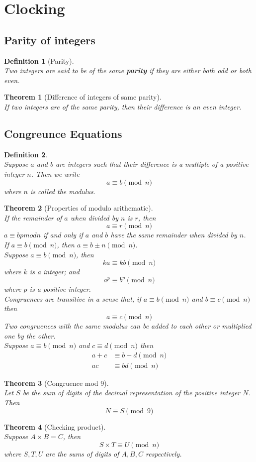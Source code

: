 \documentclass[12pt]{article}
\newtheorem{definition}{Definition}[section]
\newtheorem{theorem}{Theorem}[section]
\theoremstyle{definition}
\begin{document}
\section{Clocking}
\subsection{Parity of integers}
\begin{definition}[Parity]
\hfill\\\normalfont Two integers are said to be of the same \textbf{parity} if they are either both odd or both even.
\end{definition}
\begin{theorem}[Difference of integers of same parity]
\hfill\\\normalfont If two integers are of the same parity, then their difference is an even integer.
\end{theorem}
\subsection{Congreunce Equations}
\begin{definition}
\hfill\\\normalfont Suppose $a$ and $b$ are integers such that their difference is a multiple of a positive integer $n$. Then we write
\[
a\equiv b \pmod n
\]
where $n$ is called the modulus.
\end{definition}
\begin{theorem}[Properties of modulo arithematic]
\hfill\\\normalfont If the remainder of $a$ when divided by $n$ is $r$, then
\[
a\equiv r \pmod n
\]
$a\equiv b pmod n$ if and only if $a$ and $b$ have the same remainder when divided by $n$.\\
If $a\equiv b\pmod n$, then $a\equiv b\pm n\pmod n$.\\
Suppose $a\equiv b\pmod n$, then
\[
ka \equiv kb \pmod n
\]
where $k$ is a integer; and
\[
a^p\equiv b^p\pmod n
\]
where $p$ is a positive integer.\\
Congruences are transitive in a sense that, if $a\equiv b\pmod n$ and $b\equiv c\pmod n$ then
\[
a\equiv c\pmod n
\]
Two congruences with the same modulus can be added to each other or multiplied one by the other.\\Suppose $a\equiv b\pmod n$ and $c\equiv d\pmod n$ then
\begin{align*}
a+c&\equiv b+d\pmod n\\
ac&\equiv bd\pmod n
\end{align*}
\end{theorem}
\begin{theorem}[Congruence mod 9]
\hfill\\\normalfont Let $S$ be the sum of digits of the decimal representation of the positive integer $N$. Then
\[
N\equiv S\pmod 9
\]
\end{theorem}
\begin{theorem}[Checking product]
\hfill\\\normalfont Suppose $A\times B = C$, then
\[
S\times T\equiv U\pmod n
\]
where $S,T,U$ are the sums of digits of $A,B,C$ respectively.
\end{theorem}
\clearpage
\end{document}
